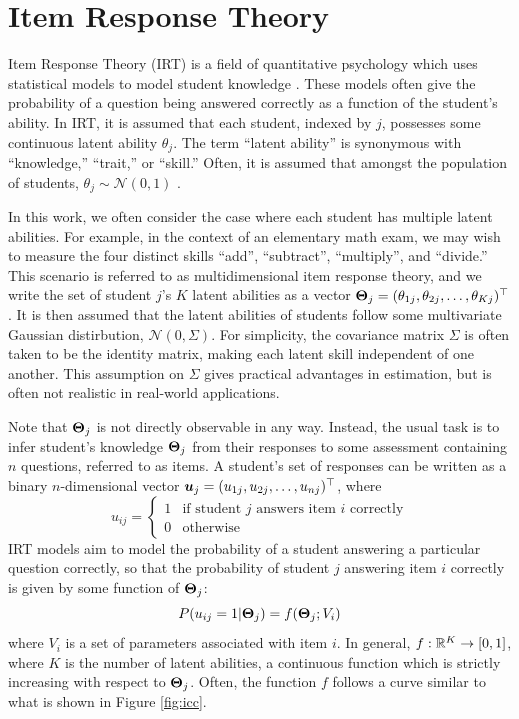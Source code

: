 \section{Item Response Theory}\label{sec:irt}
Item Response Theory (IRT) is a field of quantitative psychology which uses statistical models to model student knowledge \cite{lord1968}. These models often give the probability of a question being answered correctly as a function of the student's ability. In IRT, it is assumed that each student, indexed by $j$, possesses some continuous latent ability $\theta_j$. The term ``latent ability'' is synonymous with ``knowledge,'' ``trait,'' or ``skill.'' Often, it is assumed that amongst the population of students, $\theta_j \sim \mathcal{N}(0,1)$ \cite{thissen}. 

In this work, we often consider the case where each student has multiple latent abilities. For example, in the context of an elementary math exam, we may wish to measure the four distinct skills ``add'', ``subtract'', ``multiply'', and ``divide.'' This scenario is referred to as multidimensional item response theory, and we write the set of student $j$'s $K$ latent abilities as a vector $\boldsymbol{\Theta}_j = (\theta_{1j}, \theta_{2j}, \ldots, \theta_{Kj})^\top$. It is then assumed that the latent abilities of students follow some multivariate Gaussian distirbution, $\mathcal{N}(0, \Sigma)$. For simplicity, the covariance matrix $\Sigma$ is often taken to be the identity matrix, making each latent skill independent of one another. This assumption on $\Sigma$ gives practical advantages in estimation, but is often not realistic in real-world applications.

Note that $\boldsymbol{\Theta}_j$ is not directly observable in any way. Instead, the usual task is to infer student's knowledge $\boldsymbol{\Theta}_j$ from their responses to some assessment containing $n$ questions, referred to as items. A student's set of responses can be written as a binary $n$-dimensional vector $\boldsymbol{u}_j = (u_{1j}, u_{2j}, \ldots, u_{nj})^\top$, where 
\begin{equation}
  u_{ij} = \begin{cases} 1 & \text{if student } j \text{ answers item } i \text{ correctly} \\0 & \text{otherwise} \end{cases} 
  \label{eq:responses}
\end{equation}
IRT models aim to model the probability of a student answering a particular question correctly, so that the probability of student $j$ answering item $i$ correctly is given by some function of $\boldsymbol{\Theta}_j$:
\begin{equation}
  P(u_{ij} = 1 | \boldsymbol{\Theta}_j) = f(\boldsymbol{\Theta}_j; V_i)
  \label{eq:item_response_prob}
\end{equation}
where $V_i$ is a set of parameters associated with item $i$. In general, $f:\mathbb{R}^K \to [0,1]$, where $K$ is the number of latent abilities, a continuous function which is strictly increasing with respect to $\boldsymbol{\Theta}_j$. Often, the function $f$ follows a curve similar to what is shown in Figure \ref{fig:icc}.

